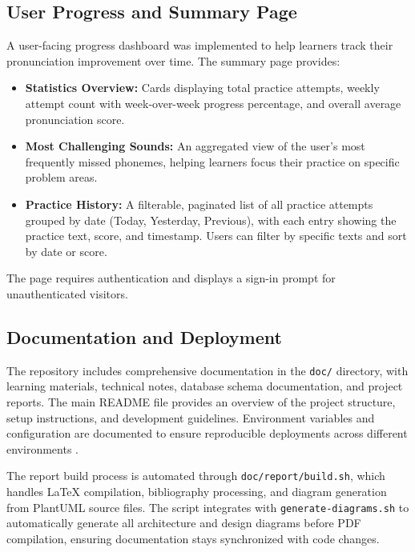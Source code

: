 \documentclass[a4paper,12pt]{report}
\begin{document}
\subsection{User Progress and Summary Page}

A user-facing progress dashboard was implemented to help learners track their pronunciation improvement over time. The summary page provides:

\begin{itemize}
    \item \textbf{Statistics Overview:} Cards displaying total practice attempts, weekly attempt count with week-over-week progress percentage, and overall average pronunciation score.
    \item \textbf{Most Challenging Sounds:} An aggregated view of the user's most frequently missed phonemes, helping learners focus their practice on specific problem areas.
    \item \textbf{Practice History:} A filterable, paginated list of all practice attempts grouped by date (Today, Yesterday, Previous), with each entry showing the practice text, score, and timestamp. Users can filter by specific texts and sort by date or score.
\end{itemize}

The page requires authentication and displays a sign-in prompt for unauthenticated visitors.

\subsection{Documentation and Deployment}

The repository includes comprehensive documentation in the \texttt{doc/} directory, with learning materials, technical notes, database schema documentation, and project reports. The main README file \cite{github2024readme} provides an overview of the project structure, setup instructions, and development guidelines. Environment variables and configuration are documented to ensure reproducible deployments across different environments \cite{github2024env}.

The report build process is automated through \texttt{doc/report/build.sh}, which handles LaTeX compilation, bibliography processing, and diagram generation from PlantUML source files. The script integrates with \texttt{generate-diagrams.sh} to automatically generate all architecture and design diagrams before PDF compilation, ensuring documentation stays synchronized with code changes.
\end{document}
